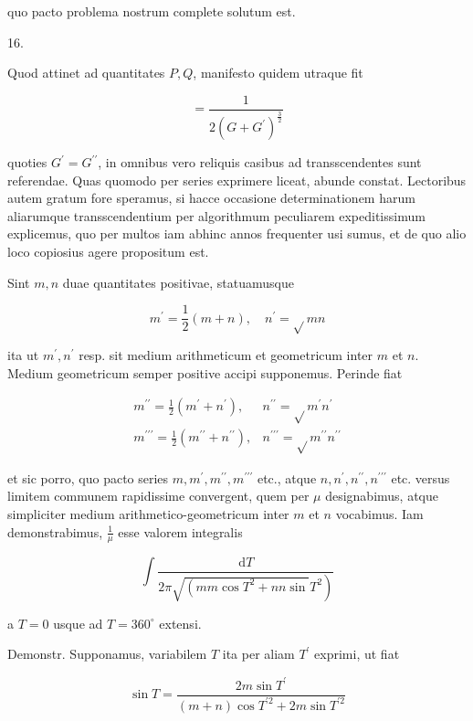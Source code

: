 \documentclass[10pt]{article}
\begin{document}
quo pacto problema nostrum complete solutum est.

16.

Quod attinet ad quantitates \(P, Q\), manifesto quidem utraque fit

\[
=\frac{1}{2\left(G+G^{\prime}\right)^{\frac{3}{2}}}
\]

quoties \(G^{\prime}=G^{\prime \prime}\), in omnibus vero reliquis casibus ad transscendentes sunt referendae. Quas quomodo per series exprimere liceat, abunde constat. Lectoribus autem gratum fore speramus, si hacce occasione determinationem harum aliarumque transscendentium per algorithmum peculiarem expeditissimum explicemus, quo per multos iam abhinc annos frequenter usi sumus, et de quo alio loco copiosius agere propositum est.

Sint \(m, n\) duae quantitates positivae, statuamusque

\[
m^{\prime}=\frac{1}{2}(m+n), \quad n^{\prime}=\sqrt{ } m n
\]

ita ut \(m^{\prime}, n^{\prime}\) resp. sit medium arithmeticum et geometricum inter \(m\) et \(n\). Medium geometricum semper positive accipi supponemus. Perinde fiat

\[
\begin{array}{ll}
m^{\prime \prime}=\frac{1}{2}\left(m^{\prime}+n^{\prime}\right), & n^{\prime \prime}=\sqrt{ } m^{\prime} n^{\prime} \\
m^{\prime \prime \prime}=\frac{1}{2}\left(m^{\prime \prime}+n^{\prime \prime}\right), & n^{\prime \prime \prime}=\sqrt{ } m^{\prime \prime} n^{\prime \prime}
\end{array}
\]

et sic porro, quo pacto series \(m, m^{\prime}, m^{\prime \prime}, m^{\prime \prime \prime}\) etc., atque \(n, n^{\prime}, n^{\prime \prime}, n^{\prime \prime \prime}\) etc. versus limitem communem rapidissime convergent, quem per \(\mu\) designabimus, atque simpliciter medium arithmetico-geometricum inter \(m\) et \(n\) vocabimus. Iam demonstrabimus, \(\frac{1}{\mu}\) esse valorem integralis

\[
\int \frac{\mathrm{d} T}{\left.2 \pi \sqrt{\left(m m \cos T^{2}+n n \sin \right.} T^{2}\right)}
\]

a \(T=0\) usque ad \(T=360^{\circ}\) extensi.

Demonstr. Supponamus, variabilem \(T\) ita per aliam \(T^{\prime}\) exprimi, ut fiat

\[
\sin T=\frac{2 m \sin T^{\prime}}{(m+n) \cos T^{\prime 2}+2 m \sin T^{\prime 2}}
\]
\end{document}
